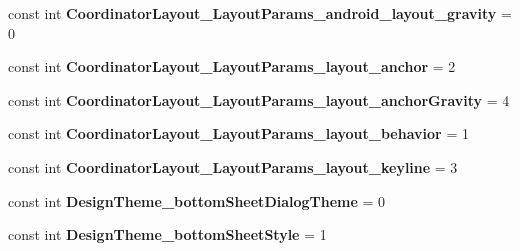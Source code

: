 \begin{DoxyCompactItemize}
\item 
\mbox{\label{class_pinned_app_1_1_droid_1_1_resource_1_1_styleable_a9aa805b83f2723e4652bfd8218dc41d9}} 
const int {\bfseries Coordinator\+Layout\+\_\+\+Layout\+Params\+\_\+android\+\_\+layout\+\_\+gravity} = 0
\item 
\mbox{\label{class_pinned_app_1_1_droid_1_1_resource_1_1_styleable_a4b6ff9ef2f626f0304d50bca05f39483}} 
const int {\bfseries Coordinator\+Layout\+\_\+\+Layout\+Params\+\_\+layout\+\_\+anchor} = 2
\item 
\mbox{\label{class_pinned_app_1_1_droid_1_1_resource_1_1_styleable_ab78c744b42f3344ae8b9f7aae7ccf1cd}} 
const int {\bfseries Coordinator\+Layout\+\_\+\+Layout\+Params\+\_\+layout\+\_\+anchor\+Gravity} = 4
\item 
\mbox{\label{class_pinned_app_1_1_droid_1_1_resource_1_1_styleable_a5d062e50077a311ee90256d62f6c8808}} 
const int {\bfseries Coordinator\+Layout\+\_\+\+Layout\+Params\+\_\+layout\+\_\+behavior} = 1
\item 
\mbox{\label{class_pinned_app_1_1_droid_1_1_resource_1_1_styleable_a6ecc2648c6ce2761a21cc1d7f1f76090}} 
const int {\bfseries Coordinator\+Layout\+\_\+\+Layout\+Params\+\_\+layout\+\_\+keyline} = 3
\item 
\mbox{\label{class_pinned_app_1_1_droid_1_1_resource_1_1_styleable_acff7d22f21540ce1ded595879abfd9c9}} 
const int {\bfseries Design\+Theme\+\_\+bottom\+Sheet\+Dialog\+Theme} = 0
\item 
\mbox{\label{class_pinned_app_1_1_droid_1_1_resource_1_1_styleable_a1541e20e83013a307859ffcfbb668886}} 
const int {\bfseries Design\+Theme\+\_\+bottom\+Sheet\+Style} = 1
\item 
\mbox{\label{class_pinned_app_1_1_droid_1_1_resource_1_1_styleable_a63c93c4c4d2ce0f24a6204965496aea2}} 

\end{DoxyCompactItemize}
